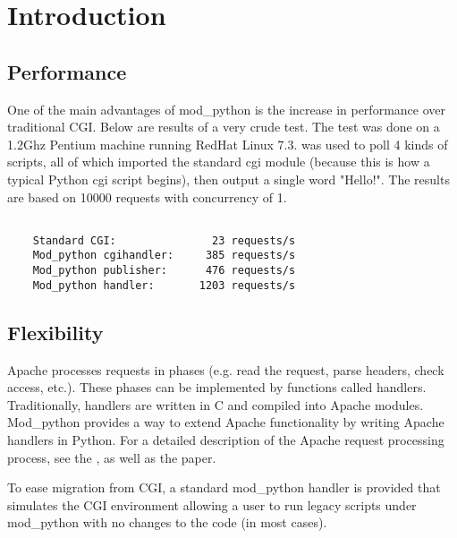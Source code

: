 \chapter{Introduction\label{introduction}}

\section{Performance\label{intr-performance}}

One of the main advantages of mod_python is the increase in
performance over traditional CGI. Below are results of a very crude
test. The test was done on a 1.2Ghz Pentium machine running RedHat
Linux
7.3. 
was used to poll 4 kinds of scripts, all of which imported the
standard cgi module (because this is how a typical Python cgi script
begins), then output a single word "Hello!". The results are based on
10000 requests with concurrency of 1.

\begin{verbatim}

    Standard CGI:               23 requests/s
    Mod_python cgihandler:     385 requests/s
    Mod_python publisher:      476 requests/s
    Mod_python handler:       1203 requests/s

\end{verbatim}         

\section{Flexibility\label{intr-flexibility}}

Apache processes requests in phases (e.g. read the request, parse
headers, check access, etc.). These phases can be implemented by
functions called handlers. Traditionally, handlers are written in C
and compiled into Apache modules. Mod_python provides a way to extend
Apache functionality by writing Apache handlers in Python. For a
detailed description of the Apache request processing process, see the
, as well
as the  paper. 

To ease migration from CGI, a standard mod_python handler is provided
that simulates the CGI environment allowing a user to run legacy scripts
under mod_python with no changes to the code (in most cases).
 
\begin{seealso}
\end{seealso}

